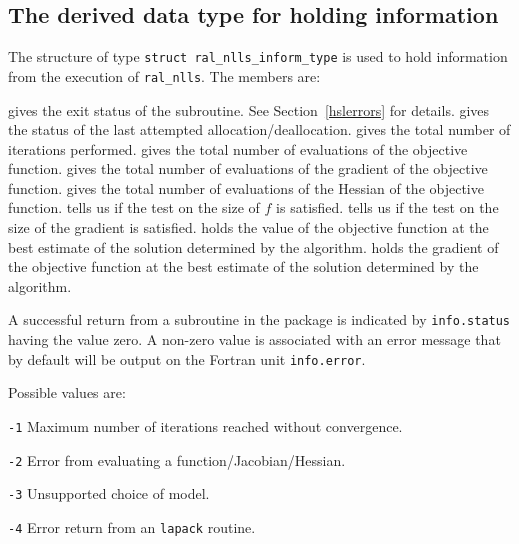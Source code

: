 \documentclass{spec}
\begin{document}
\subsection{The derived data type for holding information}
\label{typeinform} 
The structure of type {\tt struct ral\_nlls\_inform\_type} is used
to hold information from the execution of {\tt ral\_nlls}.
The members are:
\begin{description}
 gives the exit status of the subroutine.  See Section~\ref{hslerrors} for details.
 gives the status of the last attempted allocation/deallocation.
 gives the total number of iterations performed.
 gives the total number of evaluations of the objective function.
 gives the total number of evaluations of the gradient of the objective function.
 gives the total number of evaluations of the Hessian of the objective function.
 tells us if the test on the size of \(f\) is satisfied.
 tells us if the test on the size of the gradient is satisfied.
 holds the value of the objective function at the best estimate of the solution determined by the algorithm.
 holds the gradient of the objective function at the best estimate of the solution determined by the algorithm.
\end{description}


\hslerrors

A successful return from a subroutine in the package is indicated by 
{\tt info.status} having the value zero.  
A non-zero value is associated with an error message that by default will  
be output on the Fortran unit {\tt info.error}. 

Possible values are:
\begin{description}
\item{} {\tt -1} Maximum number of iterations reached without convergence.
\item{} {\tt -2} Error from evaluating a function/Jacobian/Hessian.
\item{} {\tt -3} Unsupported choice of model.
\item{} {\tt -4} Error return from an {\tt lapack} routine.
\end{description}
\end{document}
